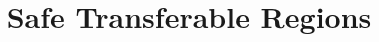 \documentclass[pldi]{sigplanconf-pldi16}
\begin{document}




\title{Safe Transferable Regions}

\maketitle

\begin{abstract}

\end{abstract}
















\end{document}
